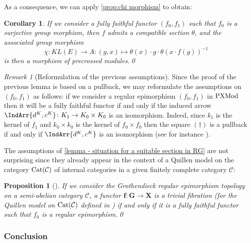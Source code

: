 \documentclass[a4paper, british, reqno]{amsart}
\newcommand{\noproof}{\qed}
\newcommand*{\mapping}{\colon}
\renewcommand*{\and}{,}
\renewcommand*{\and}{,}
\newcommand*{\CatSymb}[1]{\mathcal{#1}}
\newcommand*{\CatName}[1]{\textnormal{#1}}
\newcommand*{\C}{\CatSymb{C}}
\newcommand*{\PXMod}{\CatName{PXMod}}
\newcommand*{\Cat}{\CatName{Cat}}
\newtheorem{proposition}[theorem]{Proposition}
\newtheorem{corollary}[theorem]{Corollary}
\theoremstyle{definition}
\theoremstyle{remark}
\newtheorem{remark}[theorem]{Remark}
\begin{document}
As a consequence, we can apply \cref{prop:chi morphism} to obtain:

\begin{corollary}
	\label{cor - definition of chi}
	If we consider a fully faithful functor \((f_0,f_1)\) such that \(f_0\) is a surjective group morphism, then \(f\) admits a compatible section \(\theta\), and the associated group morphism
	\[
		\chi\colon KL(E)\to A \mapping (g,x)\mapsto \theta(x)\cdot g \cdot \theta(x\cdot f(g))^{-1}
	\]
	is then a morphism of precrossed modules.\noproof
\end{corollary}

\begin{remark}[Reformulation of the previous assumptions]\label{rem - reformulation situation for a suitable section in RG}
	Since the proof of the previous lemma is based on a pullback, we may reformulate the assumptions on \((f_0,f_1)\) as follows: if we consider a regular epimorphism \((f_0,f_1)\) in \(\PXMod\) then it will be a fully faithful functor if and only if the induced arrow \(\IndArr{d^K\and c^K}\colon K_1\to K_0\times K_0\) is an isomorphism. Indeed, since \(k_1\) is the kernel of \(f_1\) and \(k_0\times k_0\) is the kernel of \(f_0\times f_0\) then the square \((\dagger)\) is a pullback if and only if \(\IndArr{d^K\and c^K}\) is an isomorphism (see for instance \cite[Lemma~4.2.4]{BB04}).
\end{remark}

The assumptions of \cref{lemma - situation for a suitable section in RG} are not surprising since they already appear in the context of a Quillen model on the category \(\Cat(\C)\) of internal categories in a given finitely complete category \(\C\):
\begin{proposition}[{\cite[Proposition~5.6]{EKVdL}}]
	If we consider the Grothendieck regular epimorphism topology on a semi-abelian category \(\C\), a functor \(\mathbf{f}\colon \mathbf{G}\to \mathbf{X}\) is a trivial fibration (for the Quillen model on \(\Cat(\C)\) defined in \cite[Theorem~5.5]{EKVdL}) if and only if it is a fully faithful functor such that \(f_0\) is a regular epimorphism.\noproof
\end{proposition}

\subsubsection{Conclusion}\label{subsubsection - conclusion in PXMod}
\end{document}
